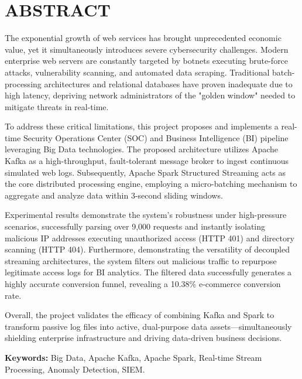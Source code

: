 \documentclass[12pt,a4paper]{report}
\begin{document}

\tableofcontents
\newpage

\listoffigures
\newpage

\listoftables
\newpage


\chapter*{ABSTRACT}

The exponential growth of web services has brought unprecedented economic value, yet it simultaneously introduces severe cybersecurity challenges. Modern enterprise web servers are constantly targeted by botnets executing brute-force attacks, vulnerability scanning, and automated data scraping. Traditional batch-processing architectures and relational databases have proven inadequate due to high latency, depriving network administrators of the "golden window" needed to mitigate threats in real-time.

To address these critical limitations, this project proposes and implements a real-time Security Operations Center (SOC) and Business Intelligence (BI) pipeline leveraging Big Data technologies. The proposed architecture utilizes Apache Kafka as a high-throughput, fault-tolerant message broker to ingest continuous simulated web logs. Subsequently, Apache Spark Structured Streaming acts as the core distributed processing engine, employing a micro-batching mechanism to aggregate and analyze data within 3-second sliding windows. 

Experimental results demonstrate the system's robustness under high-pressure scenarios, successfully parsing over 9,000 requests and instantly isolating malicious IP addresses executing unauthorized access (HTTP 401) and directory scanning (HTTP 404). Furthermore, demonstrating the versatility of decoupled streaming architectures, the system filters out malicious traffic to repurpose legitimate access logs for BI analytics. The filtered data successfully generates a highly accurate conversion funnel, revealing a 10.38\% e-commerce conversion rate. 

Overall, the project validates the efficacy of combining Kafka and Spark to transform passive log files into active, dual-purpose data assets—simultaneously shielding enterprise infrastructure and driving data-driven business decisions.

\textbf{Keywords:} Big Data, Apache Kafka, Apache Spark, Real-time Stream Processing, Anomaly Detection, SIEM.
\end{document}

